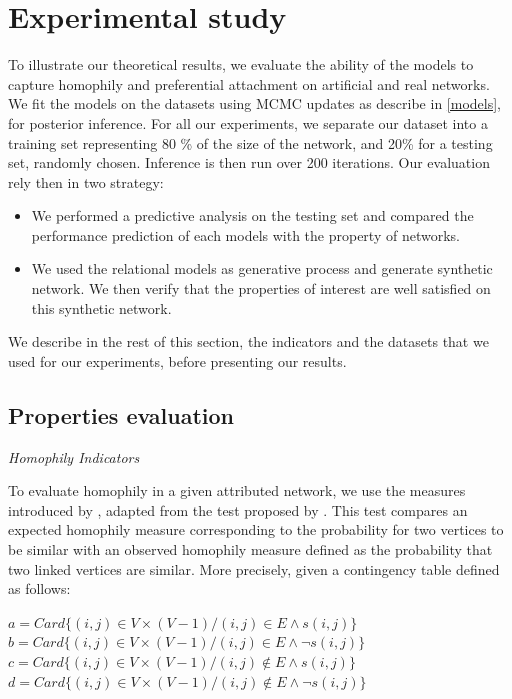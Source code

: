 \section{Experimental study}

To illustrate our theoretical results, we evaluate the ability of the models to capture homophily and preferential attachment on artificial and real networks.  We fit the models on the datasets using MCMC updates as describe in \ref{models}, for posterior inference. For all our experiments, we separate our dataset into a training set representing 80 \% of the size of the network, and 20\% for a testing set, randomly chosen. Inference is then run over 200 iterations. Our evaluation rely then in two strategy:
\begin{itemize}
\item We performed a predictive analysis on the testing set and compared the performance prediction of each models with the property of networks. 
\item We used the relational models as generative process and generate synthetic network. We then verify that the properties of interest are well satisfied on this synthetic network.
\end{itemize}

We describe in the rest of this section, the indicators and the datasets that we used for our experiments, before presenting our results.

\subsection{Properties evaluation}

\textit{Homophily Indicators}

To evaluate homophily in a given attributed network, we use the measures introduced by \cite{largeron2015}, adapted from the test proposed by \cite{Easley2010}.  This test compares an expected homophily measure corresponding to the probability for two vertices to be similar with an observed homophily measure defined as the probability that two linked vertices are similar. More precisely, given a contingency table defined as follows:

$a = Card\{(i,j)\in V\times (V-1) / (i,j) \in E \land s(i,j)\}$\\
$b = Card\{(i,j)\in V\times (V-1) / (i,j) \in E \land \neg{s(i,j)}\}$\\ 
$c = Card\{(i,j)\in V\times (V-1) / (i,j) \notin E \land s(i,j)\}$\\
$d = Card\{(i,j)\in V\times (V-1) / (i,j) \notin E \land \neg{s(i,j)}\}$\\

